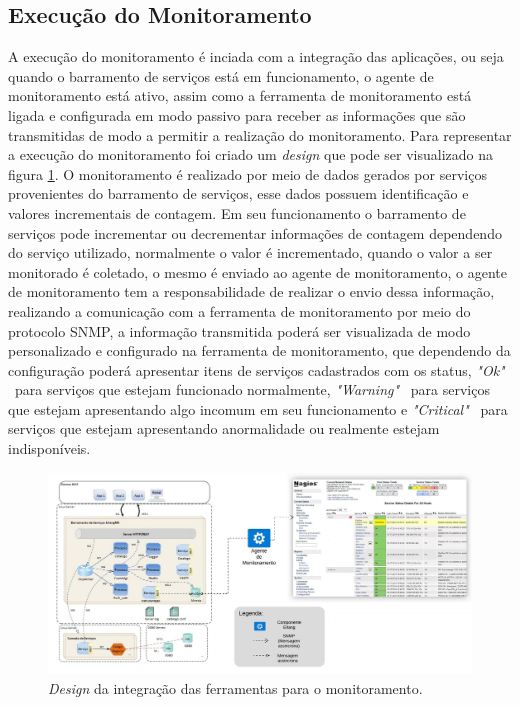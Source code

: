 \subsection{Execução do Monitoramento}

A execução do monitoramento é inciada com a integração das aplicações, ou seja quando o barramento de serviços está em funcionamento, o agente de monitoramento está ativo, assim como a ferramenta de monitoramento está ligada e configurada em modo passivo para receber as informações que são transmitidas de modo a permitir a realização do monitoramento. Para representar a execução do monitoramento foi criado um \textit{design} que pode ser visualizado na figura \ref{fun:fig:arqtProjeto}. O monitoramento é realizado por meio de dados gerados por serviços provenientes do barramento de serviços, esse dados possuem identificação e valores incrementais de contagem. Em seu funcionamento o barramento de serviços pode incrementar ou decrementar informações de contagem dependendo do serviço utilizado, normalmente o valor é incrementado, quando o valor a ser monitorado é coletado, o mesmo é enviado ao agente de monitoramento, o agente de monitoramento tem a responsabilidade de realizar o envio dessa informação, realizando a comunicação com a ferramenta de monitoramento por meio do protocolo \acrshort{SNMP}, a informação transmitida poderá ser visualizada de modo personalizado e configurado na ferramenta de monitoramento, que dependendo da configuração poderá apresentar itens de serviços cadastrados com os status, \textit{"Ok"} \ para serviços que estejam funcionado normalmente, \textit{"Warning"} \  para serviços que estejam apresentando algo incomum em seu funcionamento e \textit{"Critical"} \ para serviços que estejam apresentando anormalidade ou realmente estejam indisponíveis.	 

\begin{figure}[h!]
	\begin{center}
	\includegraphics[scale = 0.45]{img/arqtProjeto.jpeg}
	\caption{\textit{Design} da integração das ferramentas para o monitoramento.}
	\label{fun:fig:arqtProjeto}
	\end{center}
\end{figure}



